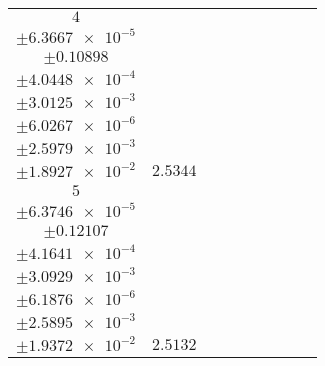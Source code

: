 \documentclass[8pt]{article}
\begin{document}
\begin{longtable}[l]{c c c c c c c c c}
$\num{4}$ & \begin{tabular}[c]{@{}c@{}}$\num{3.0742e-2}$ \\ $\pm\num{6.3667e-5}$\end{tabular} & \begin{tabular}[c]{@{}c@{}}$\num{6.9511e-2}$ \\ $\pm\num{0.10898}$\end{tabular} & \begin{tabular}[c]{@{}c@{}}$\num{-2.9561}$ \\ $\pm\num{4.0448e-4}$\end{tabular} & \begin{tabular}[c]{@{}c@{}}$\num{1.1768e+3}$ \\ $\pm\num{3.0125e-3}$\end{tabular} & \begin{tabular}[c]{@{}c@{}}$\num{2.3543}$ \\ $\pm\num{6.0267e-6}$\end{tabular} & \begin{tabular}[c]{@{}c@{}}$\num{1.1668}$ \\ $\pm\num{2.5979e-3}$\end{tabular} & \begin{tabular}[c]{@{}c@{}}$\num{4.2488}$ \\ $\pm\num{1.8927e-2}$\end{tabular} & $\num{2.5344}$\\
$\num{5}$ & \begin{tabular}[c]{@{}c@{}}$\num{3.0357e-2}$ \\ $\pm\num{6.3746e-5}$\end{tabular} & \begin{tabular}[c]{@{}c@{}}$\num{-0.51208}$ \\ $\pm\num{0.12107}$\end{tabular} & \begin{tabular}[c]{@{}c@{}}$\num{2.9566}$ \\ $\pm\num{4.1641e-4}$\end{tabular} & \begin{tabular}[c]{@{}c@{}}$\num{1.1827e+3}$ \\ $\pm\num{3.0929e-3}$\end{tabular} & \begin{tabular}[c]{@{}c@{}}$\num{2.3661}$ \\ $\pm\num{6.1876e-6}$\end{tabular} & \begin{tabular}[c]{@{}c@{}}$\num{1.1603}$ \\ $\pm\num{2.5895e-3}$\end{tabular} & \begin{tabular}[c]{@{}c@{}}$\num{4.1567}$ \\ $\pm\num{1.9372e-2}$\end{tabular} & $\num{2.5132}$\\

\end{longtable}
\end{document}
